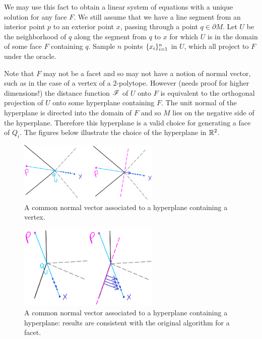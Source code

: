 \documentclass[12pt]{article}
\begin{document}
\begin{flushleft}
We may use this fact to obtain a linear system of equations with a unique solution for any face $F$.
We still assume that we have a line segment from an interior point $p$ to an exterior point $x$, passing through a point $q\in\partial M$.
Let $U$ be the neighborhood of $q$ along the segment from $q$ to $x$ for which $U$ is in the domain of some face $F$ containing $q$.
Sample $n$ points $\{x_i\}_{i=1}^n$ in $U$, which all project to $F$ under the oracle.

Note that $F$ may not be a facet and so may not have a notion of normal vector, such as in the case of a vertex of a $2$-polytope.
However (needs proof for higher dimensions!) the distance function $\mathscr{F}$ of $U$ onto $F$ is equivalent to the orthogonal projection of $U$ onto some hyperplane containing $F$.
The unit normal of the hyperplane is directed into the domain of $F$ and so $M$ lies on the negative side of the hyperplane.
Therefore this hyperplane is a valid choice for generating a face of $Q_i$.
The figures below illustrate the choice of the hyperplane in $\mathbb{R}^2$.

\begin{figure}[H]
	\centering
	\includegraphics[width=0.6\textwidth]{vertex_fix.png}
	\caption{A common normal vector associated to a hyperplane containing a vertex.}
\end{figure}
\begin{figure}[H]
	\centering
	\includegraphics[width=0.6\textwidth]{facet_fix.png}
	\caption{A common normal vector associated to a hyperplane containing a hyperplane: results are consistent with the original algorithm for a facet.}
\end{figure}


\end{flushleft}
\end{document}
